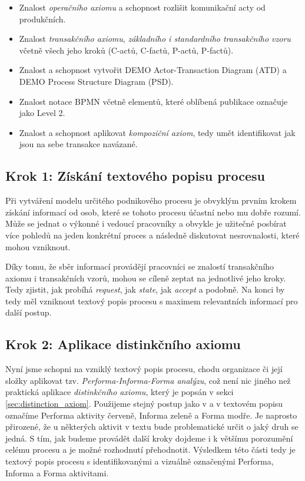 \begin{itemize}
\item Znalost \textit{operačního axiomu} a schopnost rozlišit komunikační acty od produkčních.
\item Znalost \textit{transakčního axiomu}, \textit{základního i standardního transakčního vzoru} včetně všech jeho kroků (C-actů, C-factů, P-actů, P-factů).
\item Znalost a schopnost vytvořit DEMO Actor-Transaction Diagram (ATD) a DEMO Process Structure Diagram (PSD).
\item Znalost notace BPMN včetně elementů, které oblíbená publikace \cite{Silver2011} označuje jako Level 2.
\item Znalost a schopnost aplikovat \textit{kompoziční axiom}, tedy umět identifikovat jak jsou na sebe transakce navázané.
\end{itemize}

\subsection{Krok 1: Získání textového popisu procesu}
Při vytváření modelu určitého podnikového procesu je obvyklým prvním krokem získání informací od osob, které se tohoto procesu účastní nebo mu dobře rozumí. Může se jednat o výkonné i vedoucí pracovníky a obvykle je užitečné posbírat více pohledů na jeden konkrétní proces a následně diskutovat nesrovnalosti, které mohou vzniknout.

Díky tomu, že sběr informací provádějí pracovníci se znalostí transakčního axiomu i transakčních vzorů, mohou se cíleně zeptat na jednotlivé jeho kroky. Tedy zjistit, jak probíhá \textit{request}, jak \textit{state}, jak \textit{accept} a podobně. Na konci by tedy měl vzniknout textový popis procesu s maximem relevantních informací pro další postup.

\subsection{Krok 2: Aplikace distinkčního axiomu}
Nyní jsme schopni na vzniklý textový popis procesu, chodu organizace či její složky aplikovat tzv. \textit{Performa-Informa-Forma analýzu}, což není nic jiného než praktická aplikace \textit{distinkčního axiomu}, který je popsán v sekci \ref{sec:distinction_axiom}. Použijeme stejný postup jako v \cite{Dietz2006} a v textovém popisu označíme Performa aktivity červeně, Informa zeleně a Forma modře. Je naprosto přirozené, že u některých aktivit v textu bude problematické určit o jaký druh se jedná. S tím, jak budeme provádět další kroky dojdeme i k většímu porozumění celému procesu a je možné rozhodnutí přehodnotit. Výsledkem této části tedy je textový popis procesu s identifikovanými a vizuálně označenými Performa, Informa a Forma aktivitami.

